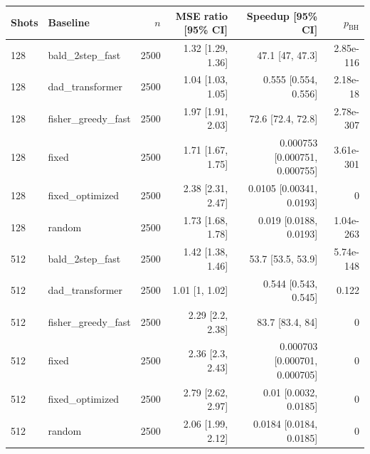 \begin{tabular}{llrrrr}
\toprule
Shots & Baseline & $n$ & MSE ratio [95\% CI] & Speedup [95\% CI] & $p_{\mathrm{BH}}$ \\
\midrule
128 & bald\_2step\_fast & 2500 & 1.32 [1.29, 1.36] & 47.1 [47, 47.3] & 2.85e-116 \\
128 & dad\_transformer & 2500 & 1.04 [1.03, 1.05] & 0.555 [0.554, 0.556] & 2.18e-18 \\
128 & fisher\_greedy\_fast & 2500 & 1.97 [1.91, 2.03] & 72.6 [72.4, 72.8] & 2.78e-307 \\
128 & fixed & 2500 & 1.71 [1.67, 1.75] & 0.000753 [0.000751, 0.000755] & 3.61e-301 \\
128 & fixed\_optimized & 2500 & 2.38 [2.31, 2.47] & 0.0105 [0.00341, 0.0193] & 0 \\
128 & random & 2500 & 1.73 [1.68, 1.78] & 0.019 [0.0188, 0.0193] & 1.04e-263 \\
512 & bald\_2step\_fast & 2500 & 1.42 [1.38, 1.46] & 53.7 [53.5, 53.9] & 5.74e-148 \\
512 & dad\_transformer & 2500 & 1.01 [1, 1.02] & 0.544 [0.543, 0.545] & 0.122 \\
512 & fisher\_greedy\_fast & 2500 & 2.29 [2.2, 2.38] & 83.7 [83.4, 84] & 0 \\
512 & fixed & 2500 & 2.36 [2.3, 2.43] & 0.000703 [0.000701, 0.000705] & 0 \\
512 & fixed\_optimized & 2500 & 2.79 [2.62, 2.97] & 0.01 [0.0032, 0.0185] & 0 \\
512 & random & 2500 & 2.06 [1.99, 2.12] & 0.0184 [0.0184, 0.0185] & 0 \\
\bottomrule
\end{tabular}
